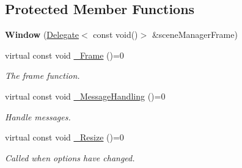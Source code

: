 \subsection*{Protected Member Functions}
\begin{DoxyCompactItemize}
\item 
{\bfseries Window} (\hyperlink{class_ensum_1_1_delegate}{Delegate}$<$ const void()$>$ \&scene\+Manager\+Frame)\hypertarget{class_ensum_1_1_core_1_1_window_ac7a0135f3a3488acdc78a37ce6413b3b}{}\label{class_ensum_1_1_core_1_1_window_ac7a0135f3a3488acdc78a37ce6413b3b}

\item 
virtual const void \hyperlink{class_ensum_1_1_core_1_1_window_ae3c16f115d465bf013410573d1b935f5}{\+\_\+\+Frame} ()=0
\begin{DoxyCompactList}\small\item\em The frame function. \end{DoxyCompactList}\item 
virtual const void \hyperlink{class_ensum_1_1_core_1_1_window_a045101d73101ee67672ff02472277487}{\+\_\+\+Message\+Handling} ()=0\hypertarget{class_ensum_1_1_core_1_1_window_a045101d73101ee67672ff02472277487}{}\label{class_ensum_1_1_core_1_1_window_a045101d73101ee67672ff02472277487}

\begin{DoxyCompactList}\small\item\em Handle messages. \end{DoxyCompactList}\item 
virtual const void \hyperlink{class_ensum_1_1_core_1_1_window_a8f14f3c446fb696f33217327b0b2da5a}{\+\_\+\+Resize} ()=0\hypertarget{class_ensum_1_1_core_1_1_window_a8f14f3c446fb696f33217327b0b2da5a}{}\label{class_ensum_1_1_core_1_1_window_a8f14f3c446fb696f33217327b0b2da5a}

\begin{DoxyCompactList}\small\item\em Called when options have changed. \end{DoxyCompactList}\end{DoxyCompactItemize}
